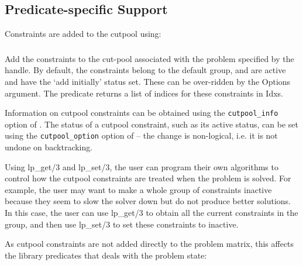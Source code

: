 \subsection{Predicate-specific Support}
Constraints are added to the cutpool using:

\subsubsection{}
    Add the constraints to the cut-pool associated with the
    problem specified by the handle. By default, the constraints belong to
    the default group, and are active and have the `add initially' status
    set. These can be over-ridden by the Options argument. The predicate
    returns a list of indices for these constraints in Idxs.

Information on cutpool constraints can be obtained using the 
{\tt cutpool_info}
option of . The status of
a cutpool constraint, such as its active status,  can be set using the 
{\tt cutpool_option} option of
 -- the change is
non-logical, i.e. it is not undone on backtracking.

Using lp_get/3 and lp_set/3, the user can program their own algorithms to
control how the cutpool constraints are treated when the problem is solved.
For example, the user may want to make a whole group of constraints
inactive because they seem to slow the solver down but do not produce
better solutions. In this case, the user can use lp_get/3 to obtain all the
current constraints in the group, and then use lp_set/3 to set these
constraints to inactive.

As cutpool constraints are not added directly to the problem matrix, this
affects the library predicates that deals with the problem state:

